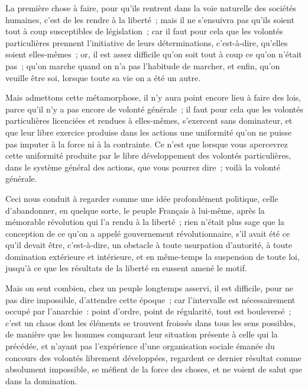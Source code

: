 \documentclass[french,twoside]{book} %
\begin{document}
La première chose à faire, pour qu’ils rentrent dans la voie naturelle des sociétés humaines, c’est de les rendre à la liberté ; mais il ne s’ensuivra pas qu’ils soient tout à coup susceptibles de législation ; car il faut pour cela que les volontés particulières prennent l’initiative de leurs déterminations, c’est-à-dire, qu’elles soient elles-mêmes ; or, il est assez difficile qu’on soit tout à coup ce qu’on n’était pas ; qu’on marche quand on n’a pas l’habitude de marcher, et enfin, qu’on veuille être soi, lorsque toute sa vie on a été un autre.\par
Mais admettons cette métamorphose, il n’y aura point encore lieu à faire des lois, parce qu’il n’y a pas encore de volonté générale ; il faut pour cela que les volontés particulières licenciées et rendues à elles-mêmes, s’exercent sans dominateur, et que leur libre exercice produise dans les actions une uniformité qu’on ne puisse pas imputer à la force ni à la contrainte. Ce n’est que lorsque vous apercevrez cette uniformité produite par le libre développement des volontés particulières, dans le système général des actions, que vous pourrez dire ; voilà la volonté générale.\par
Ceci nous conduit à regarder comme une idée profondément politique, celle d’abandonner, en quelque sorte, le peuple Français à lui-même, après la mémorable révolution qui l’a rendu à la liberté ; rien n’était plus sage que la conception de ce qu’on a appelé gouvernement révolutionnaire, s’il avait été ce qu’il devait être, c’est-à-dire, un obstacle à toute usurpation d’autorité, à toute domination extérieure et intérieure, et en même-temps la suspension de toute loi, jusqu’à ce que les résultats de la liberté en eussent amené le motif.\par
Mais on sent combien, chez un peuple longtemps asservi, il est difficile, pour ne pas dire impossible, d’attendre cette époque ; car l’intervalle est nécessairement occupé par l’anarchie : point d’ordre, point de régularité, tout est bouleversé ; c’est un chaos dont les éléments se trouvent froissés dans tous les sens possibles, de manière que les hommes comparant leur situation présente à celle qui la précédée, et n’ayant pas l’expérience d’une organisation sociale émanée du concours des volontés librement développées, regardent ce dernier résultat comme absolument impossible, se méfient de la force des choses, et ne voient de salut que dans la domination.\par
\end{document}
